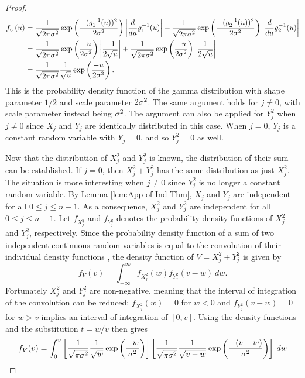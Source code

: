 \begin{theorem}
\begin{proof}
\begin{align*}
f_U(u) &= \frac{1}{\sqrt{2\pi\sigma^2}}\exp\left(\frac{-(g_1^{-1}(u))^2}{2\sigma^2}\right)\left|\frac{d}{du}g_1^{-1}(u)\right| + \frac{1}{\sqrt{2\pi\sigma^2}}\exp\left(\frac{-(g_2^{-1}(u))^2}{2\sigma^2}\right)\left|\frac{d}{du}g_2^{-1}(u)\right| \\
&= \frac{1}{\sqrt{2\pi\sigma^2}}\exp\left(\frac{-u}{2\sigma^2}\right)\left|\frac{-1}{2\sqrt{u}}\right| + \frac{1}{\sqrt{2\pi\sigma^2}}\exp\left(\frac{-u}{2\sigma^2}\right)\left|\frac{1}{2\sqrt{u}}\right| \\
&= \frac{1}{\sqrt{2\pi\sigma^2}} \frac{1}{\sqrt{u}} \exp\left(\frac{-u}{2\sigma^2}\right).
\end{align*}
This is the probability density function of the gamma distribution with shape parameter $1/2$ and scale parameter $2\sigma^2$. The same argument holds for $j \neq 0$, with scale parameter instead being $\sigma^2$. The argument can also be applied for $Y_j^2$ when $j \neq 0$ since $X_j$ and $Y_j$ are identically distributed in this case. When $j = 0$, $Y_j$ is a constant random variable with $Y_j = 0$, and so $Y_j^2 = 0$ as well. \par 
Now that the distribution of $X_j^2$ and $Y_j^2$ is known, the distribution of their sum can be established. If $j = 0$, then $X_j^2 + Y_j^2$ has the same distribution as just $X_j^2$. The situation is more interesting when $j \neq 0$ since $Y_j^2$ is no longer a constant random variable. By Lemma \ref{lem:App of Ind Thm}, $X_j$ and $Y_j$ are independent for all $0 \leq j \leq n-1$. As a consequence, $X_j^2$ and $Y_j^2$ are independent for all $0 \leq j \leq n-1$. Let $f_{X_j^2}$ and $f_{Y_j^2}$ denotes the probability density functions of $X_j^2$ and $Y_j^2$, respectively. Since the probability density function of a sum of two independent continuous random variables is equal to the convolution of their individual density functions \cite[p.~215]{CasellaBerger02}, the density function of $V = X_j^2 + Y_j^2$ is given by 
\[f_V(v) = \int_{-\infty}^{\infty} f_{X_j^2}(w)f_{Y_j^2}(v-w) \: dw.\]
Fortunately $X_j^2$ and $Y_j^2$ are non-negative, meaning that the interval of integration of the convolution can be reduced; $f_{X_j^2}(w) = 0$ for $w < 0$ and $f_{Y_j^2}(v-w) = 0$ for $w > v$ implies an interval of integration of $[0,v]$. Using the density functions and the substitution $t = w/v$ then gives
\begin{align*}
f_V(v) &= \int_0^v \left[\frac{1}{\sqrt{\pi\noiseSD^2}} \frac{1}{\sqrt{w}} \exp\left(\frac{-w}{\noiseSD^2}\right)\right]\left[\frac{1}{\sqrt{\pi\noiseSD^2}} \frac{1}{\sqrt{v-w}} \exp\left(\frac{-(v-w)}{\noiseSD^2}\right)\right] \: dw \\

\end{align*}
\end{proof}
\end{theorem}
